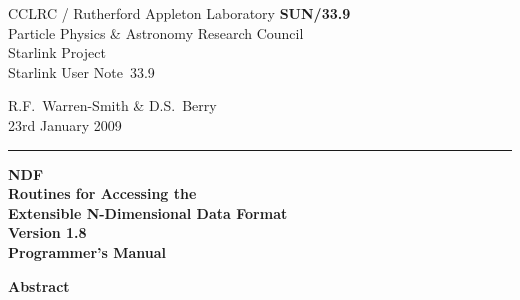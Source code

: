 \documentclass[twoside,11pt]{article}
\newcommand{\stardoccategory}  {Starlink User Note}
\newcommand{\stardocinitials}  {SUN}
\newcommand{\stardocnumber}    {33.9}
\newcommand{\stardocauthors}   {R.F.~Warren-Smith \& D.S.~Berry}
\newcommand{\stardocdate}      {23rd January 2009}
\newcommand{\stardoctitle}     {NDF \\ [\latex{1ex}]
                                Routines for Accessing the\\
                                Extensible N-Dimensional Data Format}
\newcommand{\stardocversion}   {Version 1.8}
\newcommand{\stardocmanual}    {Programmer's Manual}
\newcommand{\stardocname}{\stardocinitials /\stardocnumber}
\newenvironment{latexonly}{}{}
\newcommand{\latex}[1]{#1}
\begin{document}
\thispagestyle{empty}

\begin{latexonly}
   CCLRC / {\sc Rutherford Appleton Laboratory} \hfill {\bf \stardocname}\\
   {\large Particle Physics \& Astronomy Research Council}\\
   {\large Starlink Project\\}
   {\large \stardoccategory\ \stardocnumber}
   \begin{flushright}
   \stardocauthors\\
   \stardocdate
   \end{flushright}
   \vspace{-4mm}
   \rule{\textwidth}{0.5mm}
   \vspace{5mm}
   \begin{center}
   {\Huge\bf  \stardoctitle \\ [2.5ex]}
   {\LARGE\bf \stardocversion \\ [4ex]}
   {\Huge\bf  \stardocmanual}
   \end{center}
   \vspace{5mm}

   \vspace{15mm}
   \begin{center}
      {\Large\bf Abstract}
   \end{center}
\end{latexonly}
\end{document}
